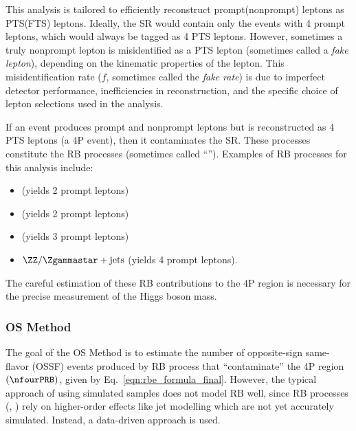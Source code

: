 This analysis is tailored to efficiently reconstruct prompt(nonprompt) leptons as PTS(FTS) leptons.
Ideally, the SR would contain only the events with 4 prompt leptons, which would always be tagged as 4 PTS leptons.
However, sometimes a truly nonprompt lepton is misidentified as a PTS lepton (sometimes called a \emph{fake lepton}), depending on the kinematic properties of the lepton.
This misidentification rate ($f$, sometimes called the \emph{fake rate}) is due to imperfect detector performance, inefficiencies in reconstruction, and the specific choice of lepton selections used in the analysis.

If an event produces prompt and nonprompt leptons but is reconstructed as 4 PTS leptons (a 4P event), then it contaminates the SR.
These processes constitute the RB processes (sometimes called ``\ZplusX'').
Examples of RB processes for this analysis include:
\begin{itemize}
	\item \Zplusjets (yields 2 prompt leptons)
	\item \ttbarplusjets (yields 2 prompt leptons)
	\item \WZplusjets (yields 3 prompt leptons)
	\item $\ZZ/\Zgammastar + \text{jets}$ (yields 4 prompt leptons).
\end{itemize}
The careful estimation of these RB contributions to the 4P region is necessary for the precise measurement of the Higgs boson mass.

\subsubsection{OS Method}
The goal of the OS Method is to estimate the number of opposite-sign same-flavor (OSSF) \fourl events produced by RB process that ``contaminate'' the 4P region $\left( \nfourPRB \right)$, given by Eq.~\ref{eqn:rbe_formula_final}.
However, the typical approach of using simulated samples does not model RB well, since RB processes (\eg, \Zplusjets) rely on higher-order effects like jet modelling which are not yet accurately simulated.
Instead, a data-driven approach is used.

